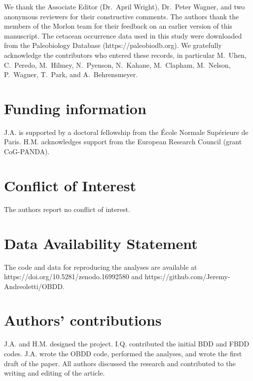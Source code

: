 \documentclass[oupdraft]{sysbio}
\newcommand{\revised}[1]{{\color{blue} #1}}
\begin{document}
\revised{We thank the Associate Editor (Dr.\ April Wright), Dr.\ Peter Wagner, and two anonymous reviewers for their constructive comments.} The authors thank the members of the Morlon team for their feedback on an earlier version of this manuscript. \revised{The cetacean occurrence data used in this study were downloaded from the Paleobiology Database (https://paleobiodb.org). We gratefully acknowledge the contributors who entered these records, in particular M.~Uhen, C.~Peredo, M.~Hilmey, N.~Pyenson, N.~Kahane, M.~Clapham, M.~Nelson, P.~Wagner, T.~Park, and A.~Behrensmeyer.}

\section{Funding information}

J.A. is supported by a doctoral fellowship from the École Normale Supérieure de Paris. \revised{H.M. acknowledges support from the European Research Council (grant CoG-PANDA).}

\section{Conflict of Interest}

The authors report no conflict of interest.

\section*{Data Availability Statement}

The code and data for reproducing the analyses are available at https://doi.org/10.5281/zenodo.16992580 and https://github.com/Jeremy-Andreoletti/OBDD.

\section{Authors' contributions}

J.A. and H.M. designed the project. I.Q. contributed the initial BDD and FBDD codes. J.A. wrote the OBDD code, performed the analyses, and wrote the first draft of the paper. All authors discussed the research and contributed to the writing and editing of the article.


\clearpage


{
  \singlespacing
  \setlength{\parskip}{0pt}
  
}

\clearpage
\end{document}
